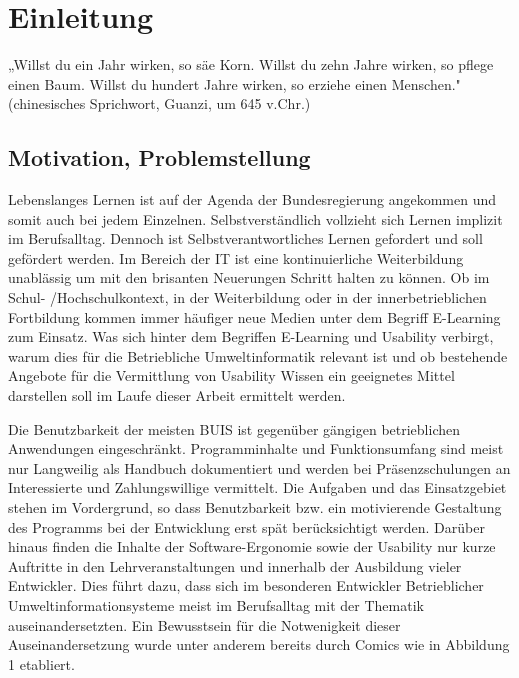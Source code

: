 \documentclass[a4paper, 12pt, twoside, BCOR=20mm, DIV=calc, abstracton, parskip=half*, toc=bibliography, toc=listof, headsepline, footsepline, headings=small, numbers=enddot]{scrreprt}
\begin{document}
	
	
	\tableofcontents
	
	
	\chapter{Einleitung} %
	„Willst du ein Jahr wirken, so säe Korn. Willst du zehn Jahre wirken, so pflege einen Baum. Willst du hundert Jahre wirken, so erziehe einen Menschen."
	(chinesisches Sprichwort, Guanzi, um 645 v.Chr.)
	
	\section{Motivation, Problemstellung}
	Lebenslanges Lernen ist auf der Agenda der Bundesregierung angekommen und somit auch bei jedem Einzelnen. Selbstverständlich vollzieht sich Lernen implizit im Berufsalltag. Dennoch ist Selbstverantwortliches Lernen gefordert und soll gefördert werden\cite{BLK}. Im Bereich der \ac{IT} ist eine kontinuierliche Weiterbildung unablässig um mit den brisanten Neuerungen Schritt halten zu können. Ob im Schul- /Hochschulkontext, in der Weiterbildung oder in der innerbetrieblichen Fortbildung kommen immer häufiger neue Medien unter dem Begriff E-Learning %
	zum Einsatz. Was sich hinter dem Begriffen E-Learning und Usability verbirgt, warum dies für die Betriebliche Umweltinformatik relevant ist und ob bestehende Angebote für die Vermittlung von Usability Wissen ein geeignetes Mittel darstellen soll im Laufe dieser Arbeit ermittelt werden. 
	
	Die Benutzbarkeit der meisten \ac{BUIS} ist gegenüber gängigen betrieblichen Anwendungen eingeschränkt. Programminhalte und Funktionsumfang sind meist nur Langweilig als Handbuch dokumentiert und werden bei Präsenzschulungen an Interessierte und Zahlungswillige vermittelt. Die Aufgaben und das Einsatzgebiet stehen im Vordergrund, so dass Benutzbarkeit bzw. ein motivierende Gestaltung des Programms bei der Entwicklung erst spät berücksichtigt werden.  
	Darüber hinaus finden die Inhalte der Software-Ergonomie sowie der Usability nur kurze Auftritte in den Lehrveranstaltungen und innerhalb der Ausbildung vieler Entwickler. Dies führt dazu, dass sich im besonderen Entwickler Betrieblicher Umweltinformationsysteme meist im Berufsalltag mit der Thematik auseinandersetzten. Ein Bewusstsein für die Notwenigkeit dieser Auseinandersetzung wurde unter anderem bereits durch Comics wie in Abbildung 1 etabliert.
	
\end{document}
